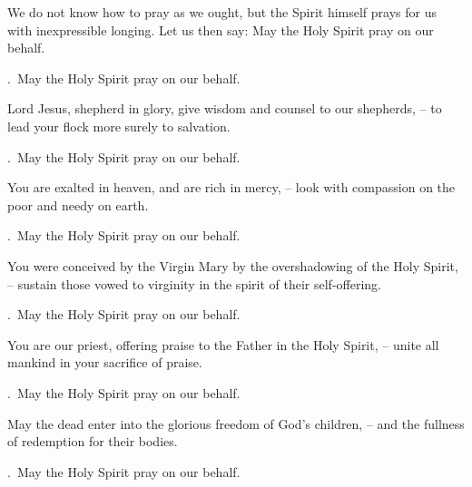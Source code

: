 \lettrine[loversize=0.15,lines=2]{W}{}e do not know how to pray as we ought, but the Spirit himself prays for us with inexpressible longing. Let us then say: May the Holy Spirit pray on our behalf.
\par \Rbar.~May the Holy Spirit pray on our behalf.

Lord Jesus, shepherd in glory, give wisdom and counsel to our shepherds,
– to lead your flock more surely to salvation.
\par \Rbar.~May the Holy Spirit pray on our behalf.

You are exalted in heaven, and are rich in mercy,
– look with compassion on the poor and needy on earth.
\par \Rbar.~May the Holy Spirit pray on our behalf.

You were conceived by the Virgin Mary by the overshadowing of the Holy Spirit,
– sustain those vowed to virginity in the spirit of their self-offering.
\par \Rbar.~May the Holy Spirit pray on our behalf.

You are our priest, offering praise to the Father in the Holy Spirit,
– unite all mankind in your sacrifice of praise.
\par \Rbar.~May the Holy Spirit pray on our behalf.

May the dead enter into the glorious freedom of God’s children,
– and the fullness of redemption for their bodies.
\par \Rbar.~May the Holy Spirit pray on our behalf.
